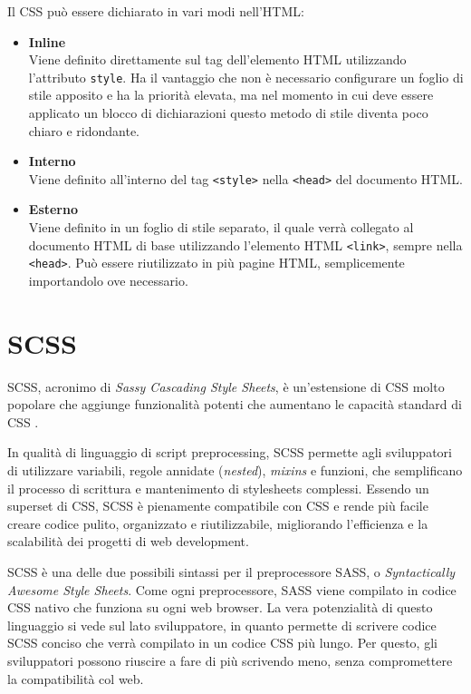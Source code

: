 Il CSS può essere dichiarato in vari modi nell'HTML:
\begin{itemize}
    \item \textbf{Inline}\\
    Viene definito direttamente sul tag dell'elemento HTML utilizzando l'attributo \Verb_style_. Ha il vantaggio che non è necessario configurare un foglio di stile apposito e ha la priorità elevata, ma nel momento in cui deve essere applicato un blocco di dichiarazioni questo metodo di stile diventa poco chiaro e ridondante.
    \item \textbf{Interno}\\
    Viene definito all'interno del tag \Verb_<style>_ nella \Verb_<head>_ del documento HTML.
    \item \textbf{Esterno}\\
    Viene definito in un foglio di stile separato, il quale verrà collegato al documento HTML di base utilizzando l'elemento HTML \Verb_<link>_, sempre nella \Verb_<head>_. Può essere riutilizzato in più pagine HTML, semplicemente importandolo ove necessario.
\end{itemize}

\section{SCSS}
SCSS, acronimo di \textit{Sassy Cascading Style Sheets}, è un'estensione di CSS molto popolare che aggiunge funzionalità potenti che aumentano le capacità standard di CSS \cite{SASS, SCSS_SASS}.

In qualità di linguaggio di script preprocessing, SCSS permette agli sviluppatori di utilizzare variabili, regole annidate (\textit{nested}), \textit{mixins} e funzioni, che semplificano il processo di scrittura e mantenimento di stylesheets complessi. Essendo un superset di CSS, SCSS è pienamente compatibile con CSS e rende più facile creare codice pulito, organizzato e riutilizzabile, migliorando l'efficienza e la scalabilità dei progetti di web development.


SCSS è una delle due possibili sintassi per il preprocessore SASS, o \textit{Syntactically Awesome Style Sheets}. Come ogni preprocessore, SASS viene compilato in codice CSS nativo che funziona su ogni web browser. La vera potenzialità di questo linguaggio si vede sul lato sviluppatore, in quanto permette di scrivere codice SCSS conciso che verrà compilato in un codice CSS più lungo. Per questo, gli sviluppatori possono riuscire a fare di più scrivendo meno, senza compromettere la compatibilità col web.

